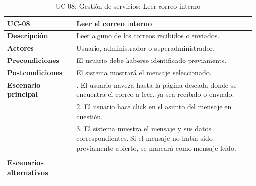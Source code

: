 \begin{table}[H]
  \begin{center}
    \begin{tabularx}{16.4cm}{|l|X|}
      \hline
      \textbf{UC-08} & \textbf{Leer el correo interno}\\
      \hline
      \textbf{Descripción} & Leer alguno de los correos recibidos o enviados.\\
      \hline
      \textbf{Actores} & Usuario, administrador o superadministrador.\\
      \hline
      \textbf{Precondiciones} & El usuario debe haberse identificado previamente.\\
      \hline
      \textbf{Postcondiciones} & El sistema mostrará el mensaje seleccionado.\\
      \hline
      \textbf{Escenario principal} & \smallskip 1. El usuario navega hasta la página deseada donde se encuentra el correo a leer, ya sea recibido o enviado.\\
      & 2. El usuario hace click en el asunto del mensaje en cuestión.\\
      & 3. El sistema muestra el mensaje y sus datos correspondientes. Si el mensaje no había sido previamente abierto, se marcará como mensaje leído.\\
      & \\
      \hline
      \textbf{Escenarios alternativos} & \\
      & \\
      \hline
    \end{tabularx}
    \caption{UC-08: Gestión de servicios: Leer correo interno}
    \label{tab:CU-leer-correo}
  \end{center}
\end{table}


